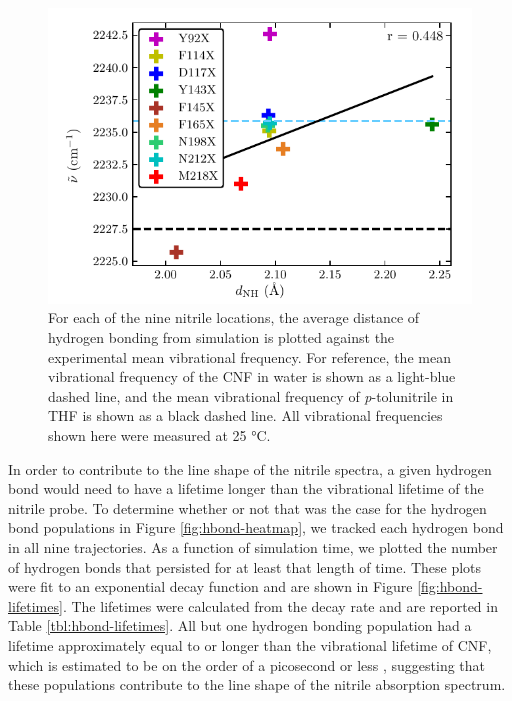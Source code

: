 \begin{figure}
    \center
    \includegraphics[width=\single]{figures-gfp-hbond/abs_max_vs_max_dist.pdf}
    \caption[Most probable $d_{\text{NH}}$ against experimental frequencies]{
        For each of the nine nitrile locations, the average distance of hydrogen bonding from simulation is plotted against the experimental mean vibrational frequency. 
        For reference, the mean vibrational frequency of the CNF in water is shown as a light-blue dashed line, and the mean vibrational frequency of \emph{p}-tolunitrile in THF is shown as a black dashed line. 
        All vibrational frequencies shown here were measured at 25 \si{\celsius}.
    }
    \label{fig:hbond-abs_vs_dist}
\end{figure}

In order to contribute to the line shape of the nitrile spectra, a given hydrogen bond would need to have a lifetime longer than the vibrational lifetime of the nitrile probe.
To determine whether or not that was the case for the hydrogen bond populations in Figure \ref{fig:hbond-heatmap}, we tracked each hydrogen bond in all nine trajectories.
As a function of simulation time, we plotted the number of hydrogen bonds that persisted for at least that length of time.
These plots were fit to an exponential decay function and are shown in Figure \ref{fig:hbond-lifetimes}.
The lifetimes were calculated from the decay rate and are reported in Table \ref{tbl:hbond-lifetimes}.
All but one hydrogen bonding population had a lifetime approximately equal to or longer than the vibrational lifetime of CNF, which is estimated to be on the order of a picosecond or less \cite{Ghosh2009, Ha2009, Waegele2010}, suggesting that these populations contribute to the line shape of the nitrile absorption spectrum.

